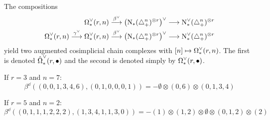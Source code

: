 The compositions
\begin{align*}
	\operatorname{\Omega}^{\vee}_{*}(r,n)&\overset{\beta^\vee}{\longrightarrow} \left(\operatorname{N}_{*}(\triangle_{+}^n)^{\otimes r}\right)^\vee \longrightarrow \operatorname{N}^\vee_{*}(\triangle_{+}^n)^{\otimes r} 
	\\
	\operatorname{\Omega}^{\vee}_{*}(r,n)\overset{\gamma^\vee}{\longrightarrow}	\operatorname{\Omega}^{\vee}_{*}(r,n)&\overset{\beta^\vee}{\longrightarrow} \left(\operatorname{N}_{*}(\triangle_{+}^n)^{\otimes r}\right)^\vee \longrightarrow \operatorname{N}^\vee_{*}(\triangle_{+}^n)^{\otimes r}
\end{align*}
	yield two augmented cosimplicial chain complexes with $[n]\mapsto \operatorname{\Omega}^{\vee}_{*}(r,n)$. The first is denoted $\hat{\operatorname{\Omega}}^{\vee}_{*}(r,\bullet)$ and the second is denoted simply by $\operatorname{\Omega}^{\vee}_{*}(r,\bullet)$. 
\begin{example}\label{example:betadual3} If $r=3$ and $n=7$:
\[
		\beta^\dd((0,0,1,3,4,6),(0,1,0,0,0,1)) = -\emptyset\otimes (0,6)\otimes (0,1,3,4)
	\]
	\end{example}
	\begin{example}\label{example:betadual5} If $r=5$ and $n=2$:
	\[
		\beta^\dd((0,1,1,1,2,2,2),(1,3,4,1,1,3,0)) = -(1)\otimes (1,2)\otimes \emptyset\otimes (0,1,2)\otimes (2)
	\]
	\end{example}
	
